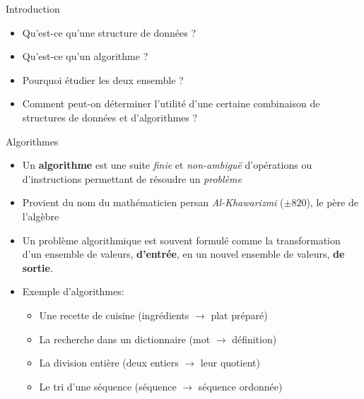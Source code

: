 \begin{frame}{Introduction}
\begin{itemize}
\item Qu'est-ce qu'une structure de données ?
\item Qu'est-ce qu'un algorithme ?
\item Pourquoi étudier les deux ensemble ?
\item Comment peut-on déterminer l'utilité d'une certaine combinaison de structures de données et d'algorithmes ?
\end{itemize}
\end{frame}

\begin{frame}{Algorithmes}

\begin{itemize}
\item Un {\bf algorithme} est une suite {\em finie} et {\em non-ambiguë} d'opérations ou d'instructions permettant de résoudre un {\em problème}
\item Provient du nom du mathématicien persan {\em Al-Khawarizmi}
  ($\pm 820$), le père de l'algèbre
\item Un problème algorithmique est souvent formulé comme la
  transformation d'un ensemble de valeurs, {\bf d'entrée}, en un
  nouvel ensemble de valeurs, {\bf de sortie}.
\item Exemple d'algorithmes:
\begin{itemize}
\item Une recette de cuisine (ingrédients $\rightarrow$ plat préparé)
\item La recherche dans un dictionnaire (mot $\rightarrow$ définition)
\item La division entière (deux entiers $\rightarrow$ leur quotient)
\item Le tri d'une séquence (séquence $\rightarrow$ séquence ordonnée)
\end{itemize}
\end{itemize}

\end{frame}

